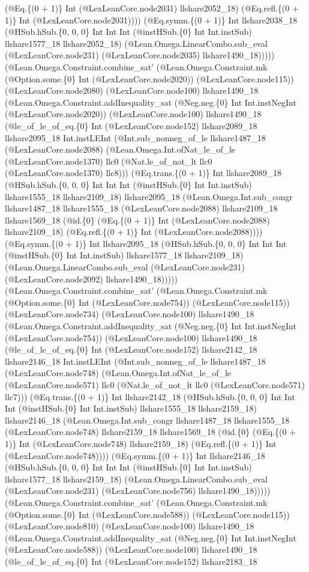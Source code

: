 \documentclass[11pt]{article}
\begin{document}
(@Eq.\{(0 + 1)\} Int (@LexLeanCore.node2031) llshare2052\_18) (@Eq.refl.\{(0 + 1)\} Int (@LexLeanCore.node2031)))) (@Eq.symm.\{(0 + 1)\} Int llshare2038\_18 (@HSub.hSub.\{0, 0, 0\} Int Int Int (@instHSub.\{0\} Int Int.instSub) llshare1577\_18 llshare2052\_18) (@Lean.Omega.LinearCombo.sub\_eval (@LexLeanCore.node231) (@LexLeanCore.node2035) llshare1490\_18))))) (@Lean.Omega.Constraint.combine\_sat' (@Lean.Omega.Constraint.mk (@Option.some.\{0\} Int (@LexLeanCore.node2020)) (@LexLeanCore.node115)) (@LexLeanCore.node2080) (@LexLeanCore.node100) llshare1490\_18 (@Lean.Omega.Constraint.addInequality\_sat (@Neg.neg.\{0\} Int Int.instNegInt (@LexLeanCore.node2020)) (@LexLeanCore.node100) llshare1490\_18 (@le\_of\_le\_of\_eq.\{0\} Int (@LexLeanCore.node152) llshare2089\_18 llshare2095\_18 Int.instLEInt (@Int.sub\_nonneg\_of\_le llshare1487\_18 (@LexLeanCore.node2088) (@Lean.Omega.Int.ofNat\_le\_of\_le (@LexLeanCore.node1370) llc0 (@Nat.le\_of\_not\_lt llc0 (@LexLeanCore.node1370) llc8))) (@Eq.trans.\{(0 + 1)\} Int llshare2089\_18 (@HSub.hSub.\{0, 0, 0\} Int Int Int (@instHSub.\{0\} Int Int.instSub) llshare1555\_18 llshare2109\_18) llshare2095\_18 (@Lean.Omega.Int.sub\_congr llshare1487\_18 llshare1555\_18 (@LexLeanCore.node2088) llshare2109\_18 llshare1569\_18 (@id.\{0\} (@Eq.\{(0 + 1)\} Int (@LexLeanCore.node2088) llshare2109\_18) (@Eq.refl.\{(0 + 1)\} Int (@LexLeanCore.node2088)))) (@Eq.symm.\{(0 + 1)\} Int llshare2095\_18 (@HSub.hSub.\{0, 0, 0\} Int Int Int (@instHSub.\{0\} Int Int.instSub) llshare1577\_18 llshare2109\_18) (@Lean.Omega.LinearCombo.sub\_eval (@LexLeanCore.node231) (@LexLeanCore.node2092) llshare1490\_18))))) (@Lean.Omega.Constraint.combine\_sat' (@Lean.Omega.Constraint.mk (@Option.some.\{0\} Int (@LexLeanCore.node754)) (@LexLeanCore.node115)) (@LexLeanCore.node734) (@LexLeanCore.node100) llshare1490\_18 (@Lean.Omega.Constraint.addInequality\_sat (@Neg.neg.\{0\} Int Int.instNegInt (@LexLeanCore.node754)) (@LexLeanCore.node100) llshare1490\_18 (@le\_of\_le\_of\_eq.\{0\} Int (@LexLeanCore.node152) llshare2142\_18 llshare2146\_18 Int.instLEInt (@Int.sub\_nonneg\_of\_le llshare1487\_18 (@LexLeanCore.node748) (@Lean.Omega.Int.ofNat\_le\_of\_le (@LexLeanCore.node571) llc0 (@Nat.le\_of\_not\_lt llc0 (@LexLeanCore.node571) llc7))) (@Eq.trans.\{(0 + 1)\} Int llshare2142\_18 (@HSub.hSub.\{0, 0, 0\} Int Int Int (@instHSub.\{0\} Int Int.instSub) llshare1555\_18 llshare2159\_18) llshare2146\_18 (@Lean.Omega.Int.sub\_congr llshare1487\_18 llshare1555\_18 (@LexLeanCore.node748) llshare2159\_18 llshare1569\_18 (@id.\{0\} (@Eq.\{(0 + 1)\} Int (@LexLeanCore.node748) llshare2159\_18) (@Eq.refl.\{(0 + 1)\} Int (@LexLeanCore.node748)))) (@Eq.symm.\{(0 + 1)\} Int llshare2146\_18 (@HSub.hSub.\{0, 0, 0\} Int Int Int (@instHSub.\{0\} Int Int.instSub) llshare1577\_18 llshare2159\_18) (@Lean.Omega.LinearCombo.sub\_eval (@LexLeanCore.node231) (@LexLeanCore.node756) llshare1490\_18))))) (@Lean.Omega.Constraint.combine\_sat' (@Lean.Omega.Constraint.mk (@Option.some.\{0\} Int (@LexLeanCore.node588)) (@LexLeanCore.node115)) (@LexLeanCore.node810) (@LexLeanCore.node100) llshare1490\_18 (@Lean.Omega.Constraint.addInequality\_sat (@Neg.neg.\{0\} Int Int.instNegInt (@LexLeanCore.node588)) (@LexLeanCore.node100) llshare1490\_18 (@le\_of\_le\_of\_eq.\{0\} Int (@LexLeanCore.node152) llshare2183\_18 
\end{document}
